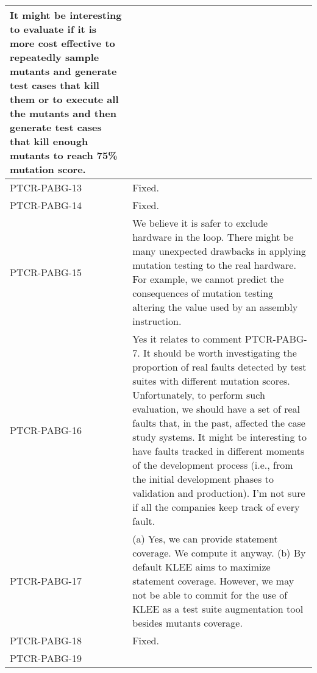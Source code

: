 \begin{longtable}{|p{1.5cm}|p{12cm}|@{}}
\begin{minipage}{12cm}
It might be interesting to evaluate if it is more cost effective to repeatedly sample mutants and generate test cases that kill them or to execute all the mutants and then generate test cases that kill enough mutants to reach 75\% mutation score.

\end{minipage}\\
\hline
PTCR-PABG-13&
\begin{minipage}{12cm}
Fixed.
\end{minipage}\\
\hline
PTCR-PABG-14&
\begin{minipage}{12cm}
Fixed.
\end{minipage}\\
\hline
PTCR-PABG-15&
\begin{minipage}{12cm}
We believe it is safer to exclude hardware in the loop. There might be many unexpected drawbacks in applying mutation testing to the real hardware. For example, we cannot predict the consequences of mutation testing altering the value used by an assembly instruction.
\end{minipage}\\
\hline
PTCR-PABG-16&
\begin{minipage}{12cm}
Yes it relates to comment PTCR-PABG-7. It should be worth investigating the proportion of real faults detected by test suites with different mutation scores. Unfortunately, to perform such evaluation, we should have a set of real faults that, in the past, affected the case study systems. It might be interesting to have faults tracked in different moments of the development process (i.e., from the initial development phases to validation and production). I'm not sure if all the companies keep track of every fault.
\end{minipage}\\
\hline
PTCR-PABG-17&
\begin{minipage}{12cm}
(a) Yes, we can provide statement coverage. We compute it anyway.
(b) By default KLEE aims to maximize statement coverage. However, we may not be able to commit for the use of KLEE as a test suite augmentation tool besides mutants coverage.
\end{minipage}\\
\hline
PTCR-PABG-18&
\begin{minipage}{12cm}
Fixed.
\end{minipage}\\
\hline
PTCR-PABG-19&
\begin{minipage}{12cm}

\end{minipage}
\end{longtable}
